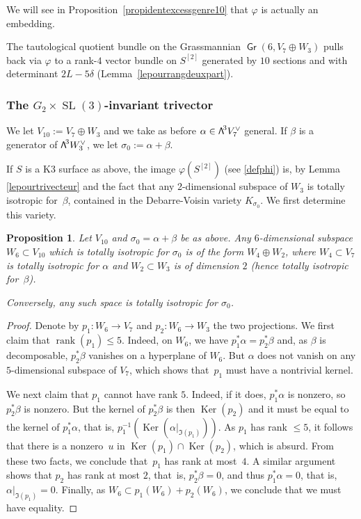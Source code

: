 \documentclass[11pt]{article}
\newtheorem{prop}[lemm]{Proposition}
\theoremstyle{definition}
\DeclareMathOperator{\Gr}{\mathsf{Gr}}
\let\phi\varphi
\let\dual\vee
\let\Ld L
\DeclareMathOperator{\Ker}{Ker}
\DeclareMathOperator{\rank}{rank}
\DeclareMathOperator{\SL}{SL}
\newcommand\bw[1]{{\hbox{\large$\mathsf{\Lambda}$}^{\!#1}}}
\newcommand\hilbS{S^{[2]}}
\begin{document}
{We will see in Proposition~\ref{propidentexcessgenre10} that $\phi$ is actually an embedding.}

The tautological quotient bundle on the Grassmannian $\Gr(6,V_7\oplus W_3)$ pulls back via $\phi$ to
a rank-$4$ vector bundle
on
$\hilbS$ generated by $10$ sections and with determinant
$2\Ld-5\delta$ (Lemma~\ref{lepourrangdeuxpart}).

\subsubsection{The $G_2\times \SL(3)$-invariant trivector}\label{sec422}
We let $V_{10}:=V_7\oplus W_3$ and we take as before $\alpha\in \bw3V_7^\dual $ general.
If $\beta $ is a generator of
$\bw3W_3^\vee$, we let $\sigma_0:=\alpha+\beta$.

If $S$ is a K3 surface as above, the image $\phi(S^{ [2]})$ (see \eqref{defphi}) is, by Lemma \ref{lepourtrivecteur} and the fact that any 2-dimensional subspace of $W_3$ is totally isotropic for~$\beta$, contained in the Debarre-Voisin variety $K_{\sigma_0}$. We first determine
this variety.

\begin{prop}\label{proisotsubspace}
Let $V_{10} $ and $\sigma_0=\alpha+\beta$ be as above.
Any $6$-dimensional subspace $W_6\subset V_{10} $ which is totally isotropic for $\sigma_0$ is of the form
$W_4\oplus W_2$, where $W_4\subset V_7 $ is totally isotropic for $\alpha$ and
$W_2\subset W_3$ is of dimension $2$ (hence totally isotropic for~$\beta$).

Conversely, any such space is totally isotropic for $\sigma_0$.
\end{prop}

\begin{proof} Denote by $p_1\colon W_6\to V_7 $ and $p_2\colon W_6\to W_3$ the two projections.
We first claim that $\rank (p_1)\le5$. Indeed, on $W_6$, we have
$p_1^*\alpha=p_2^*\beta$ and, as $\beta$ is decomposable, $p_2^*\beta$ vanishes on a hyperplane of $W_6$. But
$\alpha$ does not vanish on any $5$-dimensional subspace of $V_7$, which shows that~$p_1$ must have a nontrivial kernel.

We next claim that $p_1$ cannot have rank $5$. Indeed, if it does, $p_1^*\alpha$ is nonzero, so $p_2^*\beta$ is nonzero. But the kernel of $p_2^*\beta$ is then $\Ker (p_2)$ and it must be equal to the kernel of $p_1^*\alpha$, that is,
$p_1^{-1}(\Ker (\alpha\vert_{\Im (p_1)}))$. As $p_1$ has rank $\leq 5$, it follows that there is a
nonzero~$u$ in $\Ker (p_1)\cap \Ker (p_2)$, which is absurd. From these two facts, we conclude that~$p_1$ has rank at most~$4$. A similar argument shows that $p_2$ has rank
at most $2$, that~is, $p_2^*\beta=0$, and thus $p_1^*\alpha=0$, that is, $\alpha\vert_{\Im (p_1)}=0$. Finally, as $W_6\subset p_1(W_6)+p_2(W_6)$, we conclude that we must have equality.
\end{proof}
\end{document}
